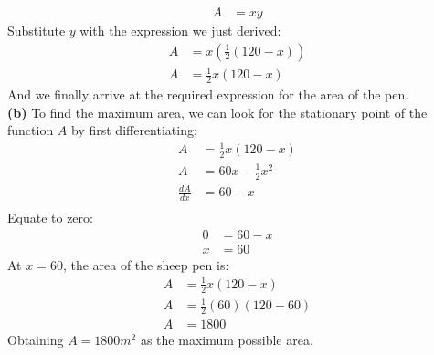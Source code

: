 \documentclass[hidelinks, a4paper, 12pt]{article}
\newcommand{\bd}{\textbf}
\newcommand{\n}{\\[\baselineskip]}
\begin{document}
                \[\begin{split}
                    A &= xy
                \end{split}\]
                Substitute $y$ with the expression we just derived:
                \[\begin{split}
                    A &= x\left(\frac{1}{2}(120-x)\right)\\
                    A &= \frac{1}{2}x(120-x)
                \end{split}\]
                And we finally arrive at the required expression for the area of the pen.\n
                \bd{(b)} To find the maximum area, we can look for the stationary point of the function $A$ by first differentiating:
                \[\begin{split}
                    A &= \frac{1}{2}x(120-x)\\
                    A &= 60x - \frac{1}{2}x^2\\
                    \frac{dA}{dx} &= 60 - x\\
                \end{split}\]
                Equate to zero:
                \[\begin{split}
                    0 &= 60-x\\
                    x &= 60
                \end{split}\]
                At $x=60$, the area of the sheep pen is:
                \[\begin{split}
                    A &= \frac{1}{2}x(120-x)\\
                    A &= \frac{1}{2}(60)(120-60)\\
                    A &= 1800
                \end{split}\]
                Obtaining $A = 1800m^2$ as the maximum possible area.
            
\end{document}
